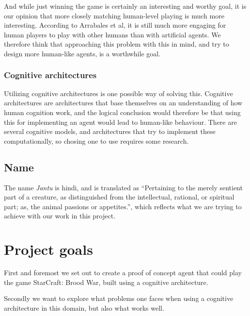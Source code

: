 And while just winning the game is certainly an interesting and worthy goal, it is our opinion that more closely matching human-level playing is much more interesting. According to Arrabales et al, it is still much more engaging for human players to play with other humans than with artificial agents.\cite{arrabales2009gamechars} We therefore think that approaching this problem with this in mind, and try to design more human-like agents, is a worthwhile goal.

\subsubsection{Cognitive architectures}
Utilizing cognitive architectures is one possible way of solving this. Cognitive architectures are architectures that base themselves on an understanding of how human cognition work, and the logical conclusion would therefore be that using this for implementing an agent would lead to human-like behaviour. There are several cognitive models, and architectures that try to implement these computationally, so chosing one to use requires some research.

\subsection{Name}
\label{sec:name}
The name {\em Jantu} is hindi, and is translated as ``Pertaining to the merely sentient part of a creature, as distinguished from the intellectual, rational, or spiritual part; as, the animal passions or appetites.'', which reflects what we are trying to achieve with our work in this project.\cite{hindijantu}

\section{Project goals}
\label{sec:goals}
First and foremost we set out to create a proof of concept agent that could play the game StarCraft: Brood War, built using a cognitive architecture.

Secondly we want to explore what problems one faces when using a cognitive architecture in this domain, but also what works well.

